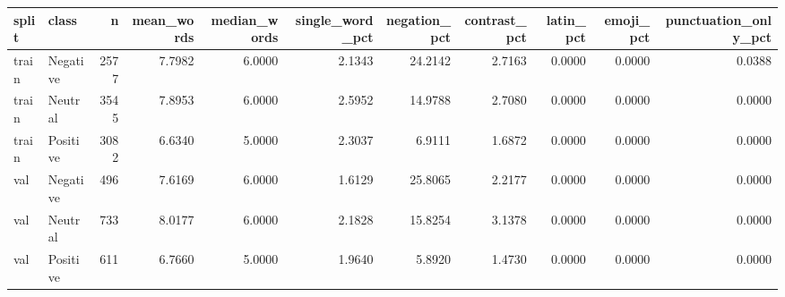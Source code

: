 \begin{tabular}{llrrrrrrrrr}
\toprule
split & class & n & mean\_words & median\_words & single\_word\_pct & negation\_pct & contrast\_pct & latin\_pct & emoji\_pct & punctuation\_only\_pct \\
\midrule
train & Negative & 2577 & 7.7982 & 6.0000 & 2.1343 & 24.2142 & 2.7163 & 0.0000 & 0.0000 & 0.0388 \\
train & Neutral & 3545 & 7.8953 & 6.0000 & 2.5952 & 14.9788 & 2.7080 & 0.0000 & 0.0000 & 0.0000 \\
train & Positive & 3082 & 6.6340 & 5.0000 & 2.3037 & 6.9111 & 1.6872 & 0.0000 & 0.0000 & 0.0000 \\
val & Negative & 496 & 7.6169 & 6.0000 & 1.6129 & 25.8065 & 2.2177 & 0.0000 & 0.0000 & 0.0000 \\
val & Neutral & 733 & 8.0177 & 6.0000 & 2.1828 & 15.8254 & 3.1378 & 0.0000 & 0.0000 & 0.0000 \\
val & Positive & 611 & 6.7660 & 5.0000 & 1.9640 & 5.8920 & 1.4730 & 0.0000 & 0.0000 & 0.0000 \\
\bottomrule
\end{tabular}
